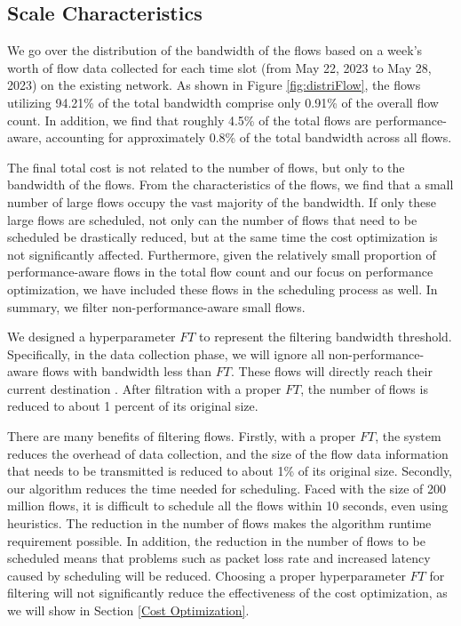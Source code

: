 \subsection{Scale Characteristics} \label{Scale Characteristics}


We go over the distribution of the bandwidth of the flows based on a week's worth of flow data collected for each time slot (from May 22, 2023 to May 28, 2023) on the existing network. As shown in Figure \ref{fig:distriFlow}, the flows utilizing 94.21\% of the total bandwidth comprise only 0.91\% of the overall flow count. In addition, we find that roughly 4.5\% of the total flows are performance-aware, accounting for approximately 0.8\% of the total bandwidth across all flows. 

 The final total cost is not related to the number of flows, but only to the bandwidth of the flows. From the characteristics of the flows, we find that a small number of large flows occupy the vast majority of the bandwidth. If only these large flows are scheduled, not only can the number of flows that need to be scheduled be drastically reduced, but at the same time the cost optimization is not significantly affected. Furthermore, given the relatively small proportion of performance-aware flows in the total flow count and our focus on performance optimization, we have included these flows in the scheduling process as well. In summary, we filter non-performance-aware small flows.

We designed a hyperparameter $FT$ to represent the filtering bandwidth threshold. Specifically, in the data collection phase, we will ignore all non-performance-aware flows with bandwidth less than $FT$. These flows will directly reach their current destination {\egresses}. After filtration with a proper $FT$, the number of flows is reduced to about 1 percent of its original size.

There are many benefits of filtering flows. Firstly, with a proper $FT$, the system reduces the overhead of data collection, and the size of the flow data information that needs to be transmitted is reduced to about 1\% of its original size. Secondly, our algorithm reduces the time needed for scheduling. Faced with the size of 200 million flows, it is difficult to schedule all the flows within 10 seconds, even using heuristics. The reduction in the number of flows makes the algorithm runtime requirement possible. In addition, the reduction in the number of flows to be scheduled means that problems such as packet loss rate and increased latency caused by scheduling will be reduced. Choosing a proper hyperparameter $FT$ for filtering will not significantly reduce the effectiveness of the cost optimization, as we will show in Section \ref{Cost Optimization}.

